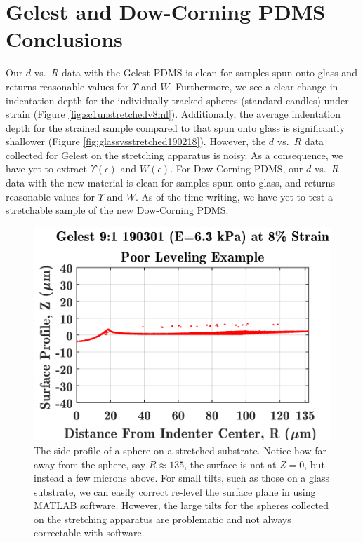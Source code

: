 \section{Gelest and Dow-Corning PDMS Conclusions} \label{sec:DataConclusions}
Our $ d $ vs.~$ R $ data with the Gelest PDMS is clean for samples spun onto glass and returns reasonable values for $ \Upsilon $ and $ W $. Furthermore, we see a clear change in indentation depth for the individually tracked spheres (standard candles) under strain (Figure \ref{fig:sc1unstretchedv8ml}). Additionally, the average indentation depth for the strained sample compared to that spun onto glass is significantly shallower (Figure \ref{fig:glassvsstretched190218}). However, the $ d $ vs.~$ R $ data collected for Gelest on the stretching apparatus is noisy. As a consequence, we have yet to extract $ \Upsilon(\epsilon) $ and $ W(\epsilon) $. For Dow-Corning PDMS, our $ d $ vs.~$ R $ data with the new material is clean for samples spun onto glass, and returns reasonable values for $ \Upsilon $ and $ W $. As of the time writing, we have yet to test a stretchable sample of the new Dow-Corning PDMS.
\begin{figure}[h!]
	\centering
	\includegraphics[width=.8\linewidth]{Chapters/Figures/190218G_tilted_axis_example}
	\caption[Side Collapse Tilt]{The side profile of a sphere on a stretched substrate. Notice how far away from the sphere, say $ R \approx 135 $, the surface is not at $ Z = 0 $, but instead a few microns above. For small tilts, such as those on a glass substrate, we can easily correct re-level the surface plane in using MATLAB software. However, the large tilts for the spheres collected on the stretching apparatus are problematic and not always correctable with software.}
	\label{fig:190218gtiltedaxisexample}
\end{figure}


